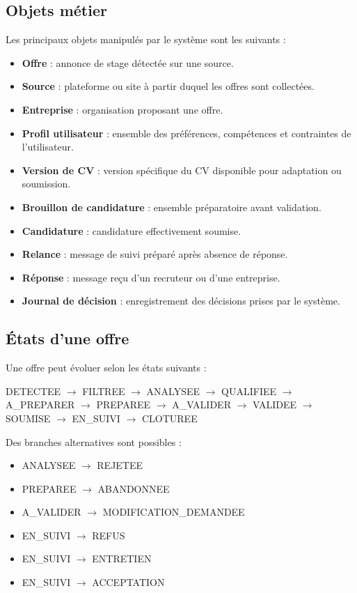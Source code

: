 \documentclass[11pt,a4paper]{article}
\begin{document}
\subsection{Objets métier}

Les principaux objets manipulés par le système sont les suivants :

\begin{itemize}
    \item \textbf{Offre} : annonce de stage détectée sur une source.
    \item \textbf{Source} : plateforme ou site à partir duquel les offres sont collectées.
    \item \textbf{Entreprise} : organisation proposant une offre.
    \item \textbf{Profil utilisateur} : ensemble des préférences, compétences et contraintes de l’utilisateur.
    \item \textbf{Version de CV} : version spécifique du CV disponible pour adaptation ou soumission.
    \item \textbf{Brouillon de candidature} : ensemble préparatoire avant validation.
    \item \textbf{Candidature} : candidature effectivement soumise.
    \item \textbf{Relance} : message de suivi préparé après absence de réponse.
    \item \textbf{Réponse} : message reçu d’un recruteur ou d’une entreprise.
    \item \textbf{Journal de décision} : enregistrement des décisions prises par le système.
\end{itemize}

\subsection{États d’une offre}

Une offre peut évoluer selon les états suivants :

\begin{center}
DETECTEE $\rightarrow$ FILTREE $\rightarrow$ ANALYSEE $\rightarrow$ QUALIFIEE
$\rightarrow$ A\_PREPARER $\rightarrow$ PREPAREE $\rightarrow$ A\_VALIDER
$\rightarrow$ VALIDEE $\rightarrow$ SOUMISE $\rightarrow$ EN\_SUIVI
$\rightarrow$ CLOTUREE
\end{center}

Des branches alternatives sont possibles :

\begin{itemize}
    \item ANALYSEE $\rightarrow$ REJETEE
    \item PREPAREE $\rightarrow$ ABANDONNEE
    \item A\_VALIDER $\rightarrow$ MODIFICATION\_DEMANDEE
    \item EN\_SUIVI $\rightarrow$ REFUS
    \item EN\_SUIVI $\rightarrow$ ENTRETIEN
    \item EN\_SUIVI $\rightarrow$ ACCEPTATION
\end{itemize}
\end{document}

